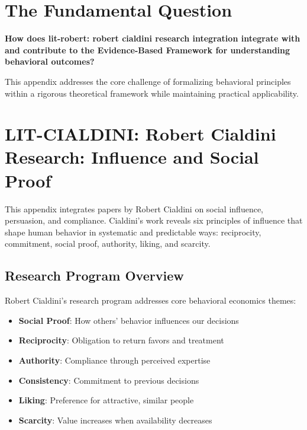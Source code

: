 \section{The Fundamental Question}
\label{sec:cia-fundamental}

\begin{tcolorbox}[
    colback=red!5!white,
    colframe=red!75!black,
    title={\textbf{Fundamental Question}}
]
\textbf{How does lit-robert: robert cialdini research integration integrate with and contribute to the
Evidence-Based Framework for understanding behavioral outcomes?}

This appendix addresses the core challenge of formalizing behavioral principles
within a rigorous theoretical framework while maintaining practical applicability.
\end{tcolorbox}




\section{LIT-CIALDINI: Robert Cialdini Research: Influence and Social Proof}
\label{app:lity}

This appendix integrates papers by Robert Cialdini on social influence,
persuasion, and compliance. Cialdini's work reveals six principles of influence that shape
human behavior in systematic and predictable ways: reciprocity, commitment, social proof,
authority, liking, and scarcity.

\subsection{Research Program Overview}

Robert Cialdini's research program addresses core behavioral economics themes:

\begin{itemize}
  \item \textbf{Social Proof}: How others' behavior influences our decisions
  \item \textbf{Reciprocity}: Obligation to return favors and treatment
  \item \textbf{Authority}: Compliance through perceived expertise
  \item \textbf{Consistency}: Commitment to previous decisions
  \item \textbf{Liking}: Preference for attractive, similar people
  \item \textbf{Scarcity}: Value increases when availability decreases
\end{itemize}


